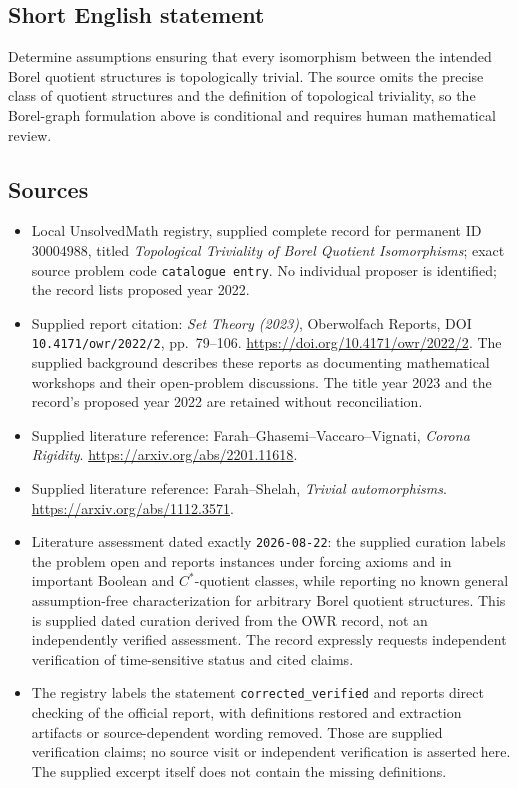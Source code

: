\documentclass[11pt]{article}
\begin{document}
\subsection{Short English statement}
Determine assumptions ensuring that every isomorphism between the intended Borel quotient structures is topologically trivial. The source omits the precise class of quotient structures and the definition of topological triviality, so the Borel-graph formulation above is conditional and requires human mathematical review.
\subsection{Sources}
\begin{itemize}
\item Local UnsolvedMath registry, supplied complete record for permanent ID \(30004988\), titled \emph{Topological Triviality of Borel Quotient Isomorphisms}; exact source problem code \texttt{catalogue entry}. No individual proposer is identified; the record lists proposed year 2022.
\item Supplied report citation: \emph{Set Theory (2023)}, Oberwolfach Reports, DOI \texttt{10.4171/owr/2022/2}, pp.\ 79--106. \url{https://doi.org/10.4171/owr/2022/2}. The supplied background describes these reports as documenting mathematical workshops and their open-problem discussions. The title year 2023 and the record's proposed year 2022 are retained without reconciliation.
\item Supplied literature reference: Farah--Ghasemi--Vaccaro--Vignati, \emph{Corona Rigidity}. \url{https://arxiv.org/abs/2201.11618}.
\item Supplied literature reference: Farah--Shelah, \emph{Trivial automorphisms}. \url{https://arxiv.org/abs/1112.3571}.
\item Literature assessment dated exactly \texttt{2026-08-22}: the supplied curation labels the problem open and reports instances under forcing axioms and in important Boolean and \(C^*\)-quotient classes, while reporting no known general assumption-free characterization for arbitrary Borel quotient structures. This is supplied dated curation derived from the OWR record, not an independently verified assessment. The record expressly requests independent verification of time-sensitive status and cited claims.
\item The registry labels the statement \texttt{corrected\_verified} and reports direct checking of the official report, with definitions restored and extraction artifacts or source-dependent wording removed. Those are supplied verification claims; no source visit or independent verification is asserted here. The supplied excerpt itself does not contain the missing definitions.
\end{itemize}
\end{document}

